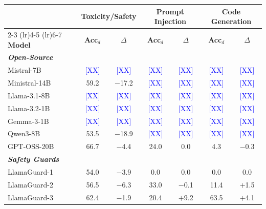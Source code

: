 
\begin{table}[t]
\centering
\scriptsize
\begin{tabular}{lcccccc}
\toprule
 & \multicolumn{2}{c}{\textbf{Toxicity/Safety}} & \multicolumn{2}{c}{\textbf{Prompt Injection}} & \multicolumn{2}{c}{\textbf{Code Generation}} \\
\cmidrule(lr){2-3} \cmidrule(lr){4-5} \cmidrule(lr){6-7}
\textbf{Model} & \textbf{Acc$_d$} & \textbf{$\Delta$} & \textbf{Acc$_d$} & \textbf{$\Delta$} & \textbf{Acc$_d$} & \textbf{$\Delta$} \\
\midrule
\multicolumn{7}{l}{\textbf{\textit{Open-Source}}} \\
Mistral-7B          & \textcolor{blue}{[XX]} & \textcolor{blue}{[XX]} & \textcolor{blue}{[XX]} & \textcolor{blue}{[XX]} & \textcolor{blue}{[XX]} & \textcolor{blue}{[XX]} \\
Ministral-14B       & 59.2 & $-$17.2 & \textcolor{blue}{[XX]} & \textcolor{blue}{[XX]} & \textcolor{blue}{[XX]} & \textcolor{blue}{[XX]} \\
Llama-3.1-8B        & \textcolor{blue}{[XX]} & \textcolor{blue}{[XX]} & \textcolor{blue}{[XX]} & \textcolor{blue}{[XX]} & \textcolor{blue}{[XX]} & \textcolor{blue}{[XX]} \\
Llama-3.2-1B        & \textcolor{blue}{[XX]} & \textcolor{blue}{[XX]} & \textcolor{blue}{[XX]} & \textcolor{blue}{[XX]} & \textcolor{blue}{[XX]} & \textcolor{blue}{[XX]} \\
Gemma-3-1B          & \textcolor{blue}{[XX]} & \textcolor{blue}{[XX]} & \textcolor{blue}{[XX]} & \textcolor{blue}{[XX]} & \textcolor{blue}{[XX]} & \textcolor{blue}{[XX]} \\
Qwen3-8B            & 53.5 & $-$18.9 & \textcolor{blue}{[XX]} & \textcolor{blue}{[XX]} & \textcolor{blue}{[XX]} & \textcolor{blue}{[XX]} \\
GPT-OSS-20B         & 66.7 & $-$4.4  & 24.0 & 0.0    & 4.3  & $-$0.3 \\
\midrule
\multicolumn{7}{l}{\textbf{\textit{Safety Guards}}} \\
LlamaGuard-1        & 54.0 & $-$3.9  & 0.0  & 0.0    & 0.0  & 0.0 \\
LlamaGuard-2        & 56.5 & $-$6.3  & 33.0 & $-$0.1 & 11.4 & $+$1.5 \\
LlamaGuard-3        & 62.4 & $-$1.9  & 20.4 & $+$9.2 & 63.5 & $+$4.1 \\

\end{tabular}
\end{table}
